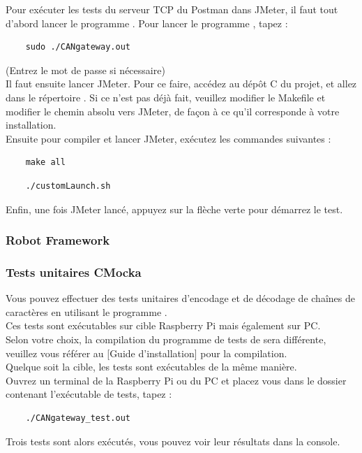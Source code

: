 Pour exécuter les tests du serveur TCP du Postman dans JMeter, il faut tout d'abord lancer le programme {\nomLogiciel}. Pour lancer le programme {\nomLogiciel}, tapez :
\vspace{-1.8\baselineskip}
\begin{lstlisting}
    sudo ./CANgateway.out
\end{lstlisting}
(Entrez le mot de passe si nécessaire)\\
Il faut ensuite lancer JMeter. Pour ce faire, accédez au dépôt C du projet, et allez dans le répertoire . Si ce n'est pas déjà fait, veuillez modifier le Makefile et modifier le chemin absolu vers JMeter, de façon à ce qu'il corresponde à votre installation.\\
Ensuite pour compiler et lancer JMeter, exécutez les commandes suivantes :
\vspace{-1.8\baselineskip}
\begin{lstlisting}
    make all
\end{lstlisting}
\vspace{-1.8\baselineskip}
\begin{lstlisting}
    ./customLaunch.sh
\end{lstlisting}
Enfin, une fois JMeter lancé, appuyez sur la flèche verte pour démarrez le test. 

\subsubsection{Robot Framework}


\subsubsection{Tests unitaires CMocka}

Vous pouvez effectuer des tests unitaires d'encodage et de décodage de chaînes de caractères en utilisant le programme {\nomLogiciel}.\\

Ces tests sont exécutables sur cible Raspberry Pi mais également sur PC.\\

Selon votre choix, la compilation du programme de tests de {\nomLogiciel} sera différente, veuillez vous référer au [Guide d'installation] pour la compilation.\\

Quelque soit la cible, les tests sont exécutables de la même manière.\\

Ouvrez un terminal de la Raspberry Pi ou du PC et placez vous dans le dossier contenant l'exécutable de tests, tapez :
\vspace{-1.8\baselineskip}
\begin{lstlisting}
    ./CANgateway_test.out
\end{lstlisting}

Trois tests sont alors exécutés, vous pouvez voir leur résultats dans la console.\\
